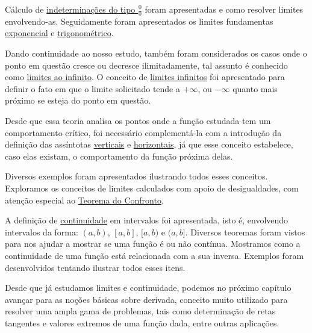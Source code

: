 \cleardoublepage\documentclass[../main.tex]{subfiles}
\begin{document}
Cálculo de \hyperlink{Ind0/0}{indeterminações do tipo $\frac{0}{0}$} foram apresentadas e como resolver limites envolvendo-as. Seguidamente foram apresentados os limites fundamentas \hyperlink{LimFundExp}{exponencial} e \hyperlink{LimFundTrig}{trigonométrico}.

Dando continuidade ao nosso estudo, também foram considerados os casos onde o ponto em questão cresce ou decresce ilimitadamente, tal assunto é conhecido como \hyperlink{Lim_no_Inf}{limites ao infinito}. O conceito de \hyperlink{LimInf}{limites infinitos} foi apresentado para definir o fato em que o limite solicitado tende a \(+\infty\), ou \(-\infty\) quanto mais próximo se esteja do ponto em questão.

Desde que essa teoria analisa os pontos onde a função estudada tem um comportamento crítico, foi necessário complementá-la com a introdução da definição das assíntotas \hyperlink{AssintVert}{verticais} e \hyperlink{AssintHoriz}{horizontais}, já que esse conceito estabelece, caso elas existam, o comportamento da função próxima delas.

Diversos exemplos foram apresentados ilustrando todos esses conceitos. Exploramos os conceitos de limites calculados com apoio de desigualdades, com atenção especial ao \hyperlink{TeoConfronto}{Teorema do Confronto}.


A definição de \hyperlink{Continuidade}{continuidade} em intervalos foi apresentada, isto é, envolvendo intervalos da forma: \((a,b)\), \([a,b]\), \([a,b)\) e \((a,b]\). Diversos teoremas foram vistos para nos ajudar a mostrar se uma função é ou não contínua. Mostramos como a continuidade de uma função está relacionada com a sua inversa. Exemplos foram desenvolvidos tentando ilustrar todos esses itens.

Desde que já estudamos limites e continuidade, podemos no próximo capítulo avançar para as noções básicas sobre derivada, conceito muito utilizado para resolver uma ampla gama de problemas, tais como determinação de retas tangentes e valores extremos de uma função dada, entre outras aplicações.
\end{document}
